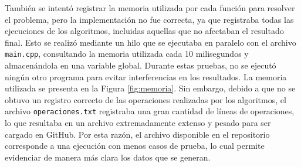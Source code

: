 También se intentó registrar la memoria utilizada por cada función para resolver el problema, pero la implementación no fue correcta, ya que registraba todas las ejecuciones de los algoritmos, incluidas aquellas que no afectaban el resultado final. Esto se realizó mediante un hilo que se ejecutaba en paralelo con el archivo \texttt{main.cpp}, consultando la memoria utilizada cada 10 milisegundos y almacenándola en una variable global. Durante estas pruebas, no se ejecutó ningún otro programa para evitar interferencias en los resultados. La memoria utilizada se presenta en la Figura \ref{fig:memoria}. Sin embargo, debido a que no se obtuvo un registro correcto de las operaciones realizadas por los algoritmos, el archivo \texttt{operaciones.txt} registraba una gran cantidad de líneas de operaciones, lo que resultaba en un archivo extremadamente extenso y pesado para ser cargado en GitHub. Por esta razón, el archivo disponible en el repositorio corresponde a una ejecución con menos casos de prueba, lo cual permite evidenciar de manera más clara los datos que se generan.


